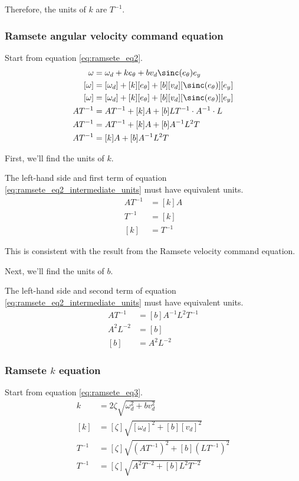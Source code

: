 Therefore, the units of $k$ are $T^{-1}$.

\subsubsection{Ramsete angular velocity command equation}

Start from equation \eqref{eq:ramsete_eq2}.
\begin{align}
  \omega &= \omega_d + ke_\theta + bv_d \sinc(e_\theta) e_y \nonumber \\
  [\omega] &= [\omega_d] + [k][e_\theta] + [b][v_d] [\sinc(e_\theta)] [e_y]
    \nonumber \\
  [\omega] &= [\omega_d] + [k][e_\theta] + [b][v_d] [\sinc(e_\theta)] [e_y]
    \nonumber \\
  A T^{-1} &= A T^{-1} + [k] A + [b] L T^{-1} \cdot A^{-1} \cdot L \nonumber \\
  A T^{-1} &= A T^{-1} + [k] A + [b] A^{-1} L^{2} T \nonumber \\
  A T^{-1} &= [k] A + [b] A^{-1} L^{2} T
    \label{eq:ramsete_eq2_intermediate_units}
\end{align}

First, we'll find the units of $k$.

The left-hand side and first term of equation
\eqref{eq:ramsete_eq2_intermediate_units} must have equivalent units.
\begin{align*}
  A T^{-1} &= [k] A \\
  T^{-1} &= [k] \\
  [k] &= T^{-1}
\end{align*}

This is consistent with the result from the Ramsete velocity command equation.

Next, we'll find the units of $b$.

The left-hand side and second term of equation
\eqref{eq:ramsete_eq2_intermediate_units} must have equivalent units.
\begin{align*}
  A T^{-1} &= [b] A^{-1} L^{2} T^{-1} \\
  A^{2} L^{-2} &= [b] \\
  [b] &= A^{2} L^{-2}
\end{align*}

\subsubsection{Ramsete $k$ equation}

Start from equation \eqref{eq:ramsete_eq3}.
\begin{align}
  k &= 2\zeta \sqrt{\omega_d^{2} + bv_d^{2}} \nonumber \\
  [k] &= [\zeta] \sqrt{[\omega_d]^{2} + [b][v_d]^{2}} \nonumber \\
  T^{-1} &= [\zeta] \sqrt{(A T^{-1})^{2} + [b] (L T^{-1})^{2}} \nonumber \\
  T^{-1} &= [\zeta] \sqrt{A^{2} T^{-2} + [b] L^{2} T^{-2}}
    \label{eq:ramsete_eq3_intermediate_units}
\end{align}

